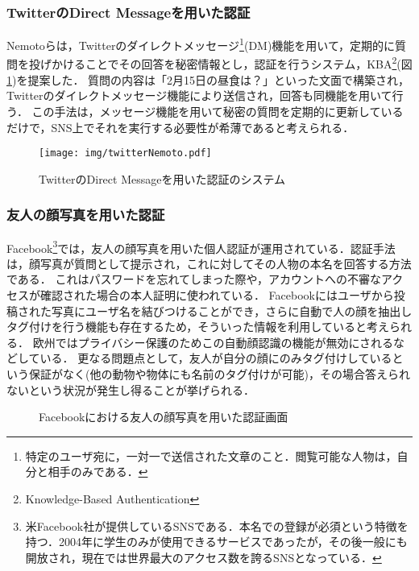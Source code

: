\subsubsection{TwitterのDirect Messageを用いた認証}\label{subsec:twitterDMAuth}
Nemotoら\cite{nemoto:2006-03-15}は，Twitterのダイレクトメッセージ\footnote{特定のユーザ宛に，一対一で送信された文章のこと．閲覧可能な人物は，自分と相手のみである．}(DM)機能を用いて，定期的に質問を投げかけることでその回答を秘密情報とし，認証を行うシステム，KBA\footnote{Knowledge-Based Authentication}(図\ref{fig:twitterNemoto})を提案した．
質問の内容は「2月15日の昼食は？」といった文面で構築され，Twitterのダイレクトメッセージ機能により送信され，回答も同機能を用いて行う．
この手法は，メッセージ機能を用いて秘密の質問を定期的に更新しているだけで，SNS上でそれを実行する必要性が希薄であると考えられる．

\begin{figure}[ht]
  \begin{center}
    \texttt{[image: img/twitterNemoto.pdf]}
  \end{center}
  \caption{TwitterのDirect Messageを用いた認証のシステム}
  \label{fig:twitterNemoto}
\end{figure}

\subsubsection{友人の顔写真を用いた認証}\label{subsec:facebookFaceAuth}
Facebook\footnote{米Facebook社が提供しているSNSである．本名での登録が必須という特徴を持つ．2004年に学生のみが使用できるサービスであったが，その後一般にも開放され，現在では世界最大のアクセス数を誇るSNSとなっている．}では，友人の顔写真を用いた個人認証が運用されている．認証手法は，顔写真が質問として提示され，これに対してその人物の本名を回答する方法である．
これはパスワードを忘れてしまった際や，アカウントへの不審なアクセスが確認された場合の本人証明に使われている．
Facebookにはユーザから投稿された写真にユーザ名を結びつけることができ，さらに自動で人の顔を抽出しタグ付けを行う機能も存在するため，そういった情報を利用していると考えられる．
欧州ではプライバシー保護のためこの自動顔認識の機能が無効にされるなどしている．
更なる問題点として，友人が自分の顔にのみタグ付けしているという保証がなく(他の動物や物体にも名前のタグ付けが可能)，その場合答えられないという状況が発生し得ることが挙げられる．

\begin{figure}[ht]
  \begin{center}
  \end{center}
  \caption{Facebookにおける友人の顔写真を用いた認証画面}
  \label{fig:facebookFaceAuth}
\end{figure}

